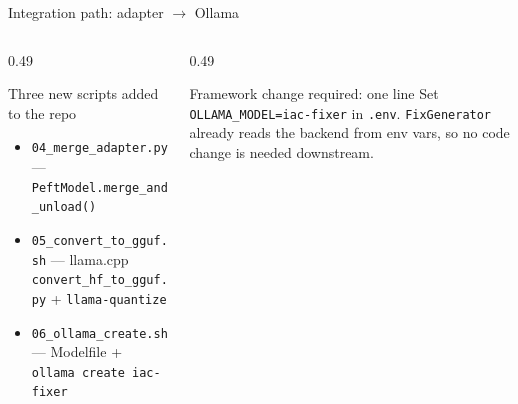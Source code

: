 \documentclass[aspectratio=169, 10pt]{beamer}
\begin{document}
\begin{frame}{Integration path: adapter $\to$ Ollama}
  \vspace{0.2em}
  \begin{columns}[T]
    \begin{column}{0.49\textwidth}
      \begin{block}{Three new scripts added to the repo}
        \scriptsize
        \begin{itemize}
          \item \texttt{04\_merge\_adapter.py}
                --- \texttt{PeftModel.merge\_and\_unload()}
          \item \texttt{05\_convert\_to\_gguf.sh}
                --- llama.cpp \texttt{convert\_hf\_to\_gguf.py} + \texttt{llama-quantize}
          \item \texttt{06\_ollama\_create.sh}
                --- Modelfile + \texttt{ollama create iac-fixer}
        \end{itemize}
      \end{block}
    \end{column}
    \begin{column}{0.49\textwidth}
      \begin{exampleblock}{Framework change required: one line}
        \scriptsize
        Set \texttt{OLLAMA\_MODEL=iac-fixer} in \texttt{.env}.
        \texttt{FixGenerator} already reads the backend from env vars, so
        no code change is needed downstream.
      \end{exampleblock}
    \end{column}
  \end{columns}
\end{frame}
\end{document}
